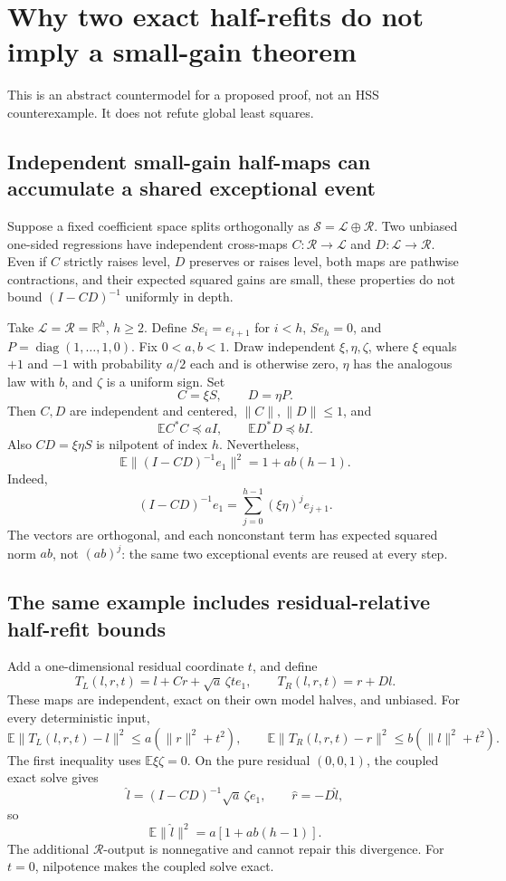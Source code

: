 \documentclass[11pt,oneside,openany,a4paper]{book}
\numberwithin{equation}{chapter}
\theoremstyle{definition}
\theoremstyle{remark}
\newcommand{\R}{\mathbb R}\newcommand{\E}{\mathbb E}\newcommand{\Prb}{\mathbb P}\newcommand{\PP}{\mathbb P}
\begin{document}
\chapter{Why two exact half-refits do not imply a small-gain theorem}\label{ch:halfsolve}
This is an abstract countermodel for a proposed proof, not an HSS counterexample. It does not refute global least squares.

\section{Independent small-gain half-maps can accumulate a shared exceptional event}
Suppose a fixed coefficient space splits orthogonally as $\mathcal S=\mathcal L\oplus\mathcal R$. Two unbiased one-sided regressions have independent cross-maps $C:\mathcal R\to\mathcal L$ and $D:\mathcal L\to\mathcal R$. Even if $C$ strictly raises level, $D$ preserves or raises level, both maps are pathwise contractions, and their expected squared gains are small, these properties do not bound $(I-CD)^{-1}$ uniformly in depth.

Take $\mathcal L=\mathcal R=\R^h$, $h\ge2$. Define $Se_i=e_{i+1}$ for $i<h$, $Se_h=0$, and $P=\operatorname{diag}(1,\ldots,1,0)$. Fix $0<a,b<1$. Draw independent $\xi,\eta,\zeta$, where $\xi$ equals $+1$ and $-1$ with probability $a/2$ each and is otherwise zero, $\eta$ has the analogous law with $b$, and $\zeta$ is a uniform sign. Set
\[
 C=\xi S,\qquad D=\eta P.
\]
Then $C,D$ are independent and centered, $\|C\|,\|D\|\le1$, and
\[
 \E C^*C\preceq aI,\qquad \E D^*D\preceq bI.
\]
Also $CD=\xi\eta S$ is nilpotent of index $h$. Nevertheless,
\begin{equation}\label{halfsolve:eq:resolvent}
 \boxed{\E\|(I-CD)^{-1}e_1\|^2=1+ab(h-1).}
\end{equation}
Indeed,
\[
 (I-CD)^{-1}e_1=\sum_{j=0}^{h-1}(\xi\eta)^je_{j+1}.
\]
The vectors are orthogonal, and each nonconstant term has expected squared norm $ab$, not $(ab)^j$: the same two exceptional events are reused at every step.

\section{The same example includes residual-relative half-refit bounds}
Add a one-dimensional residual coordinate $t$, and define
\[
 T_L(l,r,t)=l+Cr+\sqrt a\,\zeta t e_1,\qquad
 T_R(l,r,t)=r+Dl.
\]
These maps are independent, exact on their own model halves, and unbiased. For every deterministic input,
\[
 \E\|T_L(l,r,t)-l\|^2\le a(\|r\|^2+t^2),\qquad
 \E\|T_R(l,r,t)-r\|^2\le b(\|l\|^2+t^2).
\]
The first inequality uses $\E\xi\zeta=0$. On the pure residual $(0,0,1)$, the coupled exact solve gives
\[
 \widehat l=(I-CD)^{-1}\sqrt a\,\zeta e_1,\qquad
 \widehat r=-D\widehat l,
\]
so
\begin{equation}\label{halfsolve:eq:error}
 \boxed{\E\|\widehat l\|^2=a[1+ab(h-1)].}
\end{equation}
The additional $\mathcal R$-output is nonnegative and cannot repair this divergence. For $t=0$, nilpotence makes the coupled solve exact.
\end{document}
